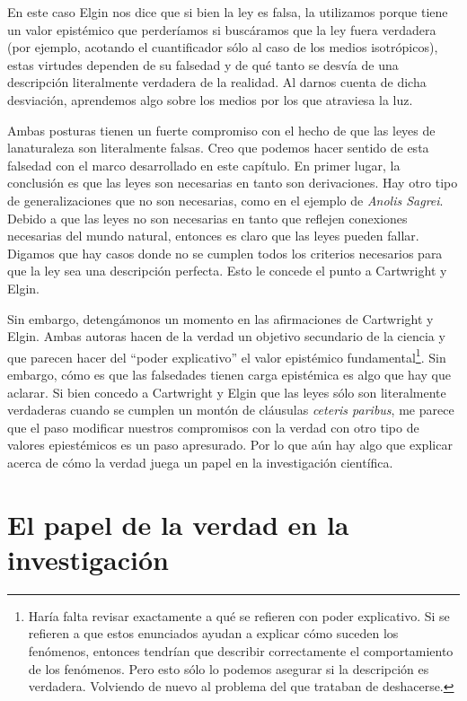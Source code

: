 En este caso Elgin nos dice que si bien la ley es falsa, la utilizamos porque tiene un valor epistémico que perderíamos si buscáramos que la ley fuera verdadera (por ejemplo, acotando el cuantificador sólo al caso de los medios isotrópicos), estas virtudes dependen de su falsedad y de qué tanto se desvía de una descripción literalmente verdadera de la realidad. Al darnos cuenta de dicha desviación, aprendemos algo sobre los medios por los que atraviesa la luz.

Ambas posturas tienen un fuerte compromiso con el hecho de que las leyes de lanaturaleza son literalmente falsas. Creo que podemos hacer sentido de esta falsedad con el marco desarrollado en este capítulo. En primer lugar, la conclusión es que las leyes son necesarias en tanto son derivaciones. Hay otro tipo de generalizaciones que no son necesarias, como en el ejemplo de \emph{Anolis Sagrei}. Debido a que las leyes no son necesarias en tanto que reflejen conexiones necesarias del mundo natural, entonces es claro que las leyes pueden fallar. Digamos que hay casos donde no se cumplen todos los criterios necesarios para que la ley sea una descripción perfecta. Esto le concede el punto a Cartwright y Elgin.

Sin embargo, detengámonos un momento en las afirmaciones de Cartwright y Elgin. Ambas autoras hacen de la verdad un objetivo secundario de la ciencia y que parecen hacer del ``poder explicativo'' el valor epistémico fundamental\footnote{Haría falta revisar exactamente a qué se refieren con poder explicativo. Si se refieren a que estos enunciados ayudan a explicar cómo suceden los fenómenos, entonces tendrían que describir correctamente el comportamiento de los fenómenos. Pero esto sólo lo podemos asegurar si la descripción es verdadera. Volviendo de nuevo al problema del que trataban de deshacerse.}. Sin embargo, cómo es que las falsedades tienen carga epistémica es algo que hay que aclarar. Si bien concedo a Cartwright y Elgin que las leyes sólo son literalmente verdaderas cuando se cumplen un montón de cláusulas \emph{ceteris paribus}, me parece que el paso modificar nuestros compromisos con la verdad con otro tipo de valores epiestémicos es un paso apresurado. Por lo que aún hay algo que explicar acerca de cómo la verdad juega un papel en la investigación científica.

\section{El papel de la verdad en la investigación}

